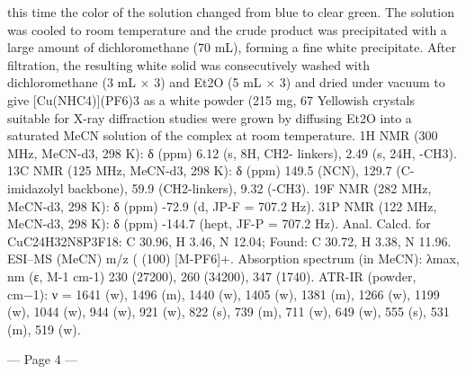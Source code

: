 this time the color of the solution changed from blue to clear green. The solution was cooled to room temperature 
and the crude product was precipitated with a large amount of dichloromethane (70 mL), forming a fine white 
precipitate. After filtration, the resulting white solid was consecutively washed with dichloromethane (3 mL × 3) 
and Et2O (5 mL × 3) and dried under vacuum to give [Cu(NHC4)](PF6)3 as a white powder (215 mg, 67%
Yellowish crystals suitable for X-ray diffraction studies were grown by diffusing Et2O into a saturated MeCN 
solution of the complex at room temperature. 1H NMR (300 MHz, MeCN-d3, 298 K): δ (ppm) 6.12 (s, 8H, CH2-
linkers), 2.49 (s, 24H, -CH3). 13C NMR (125 MHz, MeCN-d3, 298 K): δ (ppm) 149.5 (NCN), 129.7 (C-imidazolyl 
backbone), 59.9 (CH2-linkers), 9.32 (-CH3). 19F NMR (282 MHz, MeCN-d3, 298 K): δ (ppm) -72.9 (d, JP-F = 707.2 
Hz). 31P NMR (122 MHz, MeCN-d3, 298 K): δ (ppm) -144.7 (hept, JF-P = 707.2 Hz). Anal. Calcd. for 
CuC24H32N8P3F18: C 30.96, H 3.46, N 12.04; Found: C 30.72, H 3.38, N 11.96. ESI–MS (MeCN) m/z (%
(100) [M-PF6]+. Absorption spectrum (in MeCN): λmax, nm (ε, M-1 cm-1) 230 (27200), 260 (34200), 347 (1740). 
ATR-IR (powder, cm−1): ν = 1641 (w), 1496 (m), 1440 (w), 1405 (w), 1381 (m), 1266 (w), 1199 (w), 1044 (w), 944 
(w), 921 (w), 822 (s), 739 (m), 711 (w), 649 (w), 555 (s), 531 (m), 519 (w). 


--- Page 4 ---
 
